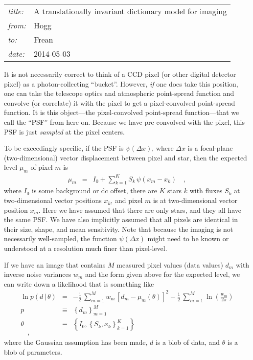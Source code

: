 \documentclass[12pt]{article}
\newcommand{\given}{\,|\,}
\begin{document}
\sloppy\sloppypar

\noindent
\begin{tabular}{ll}
\textsl{title:}   & A translationally invariant dictionary model for imaging  \\
\textsl{from:}    & Hogg \\
\textsl{to:}      & Frean \\
\textsl{date:}    & 2014-05-03
\end{tabular}
\bigskip

It is not necessarily correct to think of a CCD pixel (or other
digital detector pixel) as a photon-collecting ``bucket''.
However, \emph{if} one does take this position, one can take the
telescope optics and atmospheric point-spread function and convolve
(or correlate) it with the pixel to get a pixel-convolved point-spread
function.
It is this object---the pixel-convolved point-spread function---that
we call the ``PSF'' from here on.
Because we have pre-convolved with the pixel, this PSF is just
\emph{sampled} at the pixel centers.

To be exceedingly specific, if the PSF is $\psi(\Delta x)$, where
$\Delta x$ is a focal-plane (two-dimensional) vector displacement
between pixel and star, then the expected level $\mu_m$ of pixel $m$
is
\begin{eqnarray}\label{eq:expect}
\mu_m &=& I_0 + \sum_{k=1}^K S_k\,\psi(x_m - x_k)
\quad ,
\end{eqnarray}
where $I_0$ is some background or dc offset, there are $K$ stars $k$
with fluxes $S_k$ at two-dimensional vector positions $x_k$, and pixel
$m$ is at two-dimensional vector position $x_m$.
Here we have assumed that there are only stars, and they all have the
same PSF.
We have also implicitly assumed that all pixels are identical in their
size, shape, and mean sensitivity.
Note that because the imaging is not necessarily well-sampled, the
function $\psi(\Delta x)$ might need to be known or understood at a
resolution much finer than pixel-level.

If we have an image that contains $M$ measured pixel values (data
values) $d_m$ with inverse noise variances $w_m$ and the form given
above for the expected level, we can write down a likelihood that is
something like
\begin{eqnarray}\label{eq:like}
\ln p(d\given\theta) &=& -\frac{1}{2}\,\sum_{m=1}^M w_m\,[d_m - \mu_m(\theta)]^2 + \frac{1}{2}\,\sum_{m=1}^M \ln(\frac{w_m}{2\pi})
\\
p &\equiv& \left\{d_m\right\}_{m=1}^M
\\
\theta &\equiv& \left\{I_0, \left\{S_k, x_k\right\}_{k=1}^K\right\}
\\
\quad,
\end{eqnarray}
where the Gaussian assumption has been made, $d$ is a blob of data,
and $\theta$ is a blob of parameters.
\end{document}
